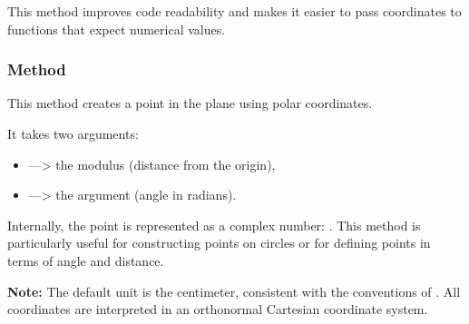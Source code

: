 \noindent
This method improves code readability and makes it easier to pass coordinates to functions that expect numerical values.

\vspace{1em}
  
\begin{minipage}{.5\textwidth-1cm}
\end{minipage}
\begin{minipage}{.5\textwidth}
\begin{tkzexample}
\end{tkzexample}
\end{minipage}

\subsubsection{Method } %
\label{ssub:method_point_polar}

This method creates a point in the plane using polar coordinates.

\medskip
\noindent
It takes two arguments:
\begin{itemize}
  \item {} —> the modulus (distance from the origin),
  \item {} —> the argument (angle in radians).
\end{itemize}

\noindent
Internally, the point is represented as a complex number: . This method is particularly useful for constructing points on circles or for defining points in terms of angle and distance.

\medskip
\noindent
\textbf{Note:} The default unit is the centimeter, consistent with the conventions of . All coordinates are interpreted in an orthonormal Cartesian coordinate system.

\vspace{1em}
 
